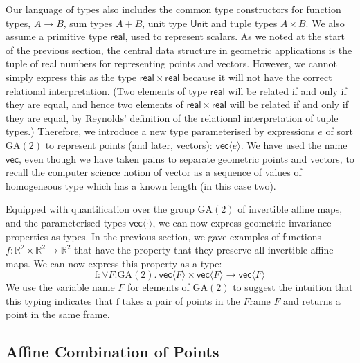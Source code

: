 \documentclass{article}
\newcommand{\GA}{\mathrm{GA}}
\begin{document}
Our language of types also includes the common type constructors for
function types, $A \to B$, sum types $A + B$, unit type
$\mathsf{Unit}$ and tuple types $A \times B$. We also assume a
primitive type $\mathsf{real}$, used to represent scalars. As we noted
at the start of the previous section, the central data structure in
geometric applications is the tuple of real numbers for representing
points and vectors. However, we cannot simply express this as the type
$\mathsf{real} \times \mathsf{real}$ because it will not have the
correct relational interpretation. (Two elements of type
$\mathsf{real}$ will be related if and only if they are equal, and
hence two elements of $\mathsf{real} \times \mathsf{real}$ will be
related if and only if they are equal, by Reynolds' definition of the
relational interpretation of tuple types.) Therefore, we introduce a
new type parameterised by expressions $e$ of sort $\GA(2)$ to
represent points (and later, vectors): $\mathsf{vec}\langle e
\rangle$. We have used the name $\mathsf{vec}$, even though we have
taken pains to separate geometric points and vectors, to recall the
computer science notion of vector as a sequence of values of
homogeneous type which has a known length (in this case two).


Equipped with quantification over the group $\GA(2)$ of invertible
affine maps, and the parameterised types $\mathsf{vec}\langle \cdot
\rangle$, we can now express geometric invariance properties as
types. In the previous section, we gave examples of functions $f :
\mathbb{R}^2 \times \mathbb{R}^2 \to \mathbb{R}^2$ that have the
property that they preserve all invertible affine maps. We can now
express this property as a type:
\begin{displaymath}
  \mathrm{f} : \forall F \mathord: \GA(2).\ \mathsf{vec}\langle F \rangle \times \mathsf{vec}\langle F \rangle \to \mathsf{vec}\langle F \rangle
\end{displaymath}
We use the variable name $F$ for elements of $\GA(2)$ to suggest the
intuition that this typing indicates that $\mathrm{f}$ takes a pair of
points in the $F$rame $F$ and returns a point in the same frame.

\subsection{Affine Combination of Points}
\label{sec:affine-combination}
\end{document}
